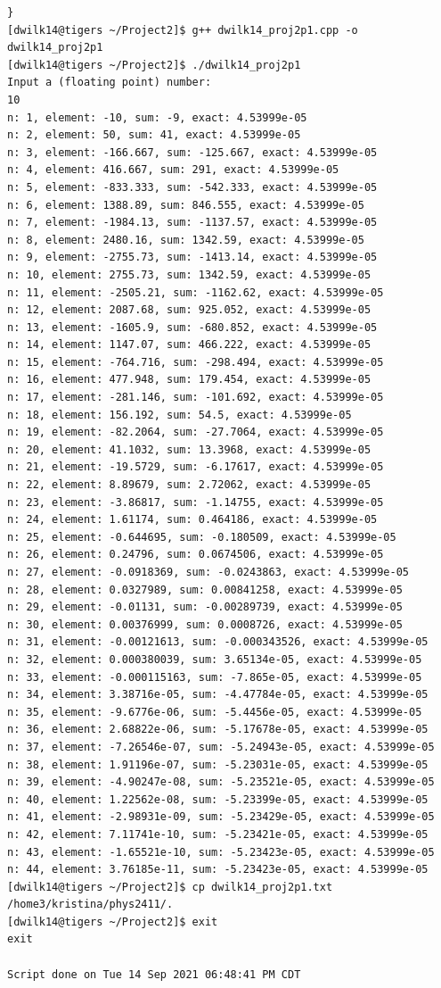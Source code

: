 \documentclass[11pt]{article}
\begin{document}
\begin{verbatim}
}
[dwilk14@tigers ~/Project2]$ g++ dwilk14_proj2p1.cpp -o dwilk14_proj2p1
[dwilk14@tigers ~/Project2]$ ./dwilk14_proj2p1
Input a (floating point) number:
10
n: 1, element: -10, sum: -9, exact: 4.53999e-05
n: 2, element: 50, sum: 41, exact: 4.53999e-05
n: 3, element: -166.667, sum: -125.667, exact: 4.53999e-05
n: 4, element: 416.667, sum: 291, exact: 4.53999e-05
n: 5, element: -833.333, sum: -542.333, exact: 4.53999e-05
n: 6, element: 1388.89, sum: 846.555, exact: 4.53999e-05
n: 7, element: -1984.13, sum: -1137.57, exact: 4.53999e-05
n: 8, element: 2480.16, sum: 1342.59, exact: 4.53999e-05
n: 9, element: -2755.73, sum: -1413.14, exact: 4.53999e-05
n: 10, element: 2755.73, sum: 1342.59, exact: 4.53999e-05
n: 11, element: -2505.21, sum: -1162.62, exact: 4.53999e-05
n: 12, element: 2087.68, sum: 925.052, exact: 4.53999e-05
n: 13, element: -1605.9, sum: -680.852, exact: 4.53999e-05
n: 14, element: 1147.07, sum: 466.222, exact: 4.53999e-05
n: 15, element: -764.716, sum: -298.494, exact: 4.53999e-05
n: 16, element: 477.948, sum: 179.454, exact: 4.53999e-05
n: 17, element: -281.146, sum: -101.692, exact: 4.53999e-05
n: 18, element: 156.192, sum: 54.5, exact: 4.53999e-05
n: 19, element: -82.2064, sum: -27.7064, exact: 4.53999e-05
n: 20, element: 41.1032, sum: 13.3968, exact: 4.53999e-05
n: 21, element: -19.5729, sum: -6.17617, exact: 4.53999e-05
n: 22, element: 8.89679, sum: 2.72062, exact: 4.53999e-05
n: 23, element: -3.86817, sum: -1.14755, exact: 4.53999e-05
n: 24, element: 1.61174, sum: 0.464186, exact: 4.53999e-05
n: 25, element: -0.644695, sum: -0.180509, exact: 4.53999e-05
n: 26, element: 0.24796, sum: 0.0674506, exact: 4.53999e-05
n: 27, element: -0.0918369, sum: -0.0243863, exact: 4.53999e-05
n: 28, element: 0.0327989, sum: 0.00841258, exact: 4.53999e-05
n: 29, element: -0.01131, sum: -0.00289739, exact: 4.53999e-05
n: 30, element: 0.00376999, sum: 0.0008726, exact: 4.53999e-05
n: 31, element: -0.00121613, sum: -0.000343526, exact: 4.53999e-05
n: 32, element: 0.000380039, sum: 3.65134e-05, exact: 4.53999e-05
n: 33, element: -0.000115163, sum: -7.865e-05, exact: 4.53999e-05
n: 34, element: 3.38716e-05, sum: -4.47784e-05, exact: 4.53999e-05
n: 35, element: -9.6776e-06, sum: -5.4456e-05, exact: 4.53999e-05
n: 36, element: 2.68822e-06, sum: -5.17678e-05, exact: 4.53999e-05
n: 37, element: -7.26546e-07, sum: -5.24943e-05, exact: 4.53999e-05
n: 38, element: 1.91196e-07, sum: -5.23031e-05, exact: 4.53999e-05
n: 39, element: -4.90247e-08, sum: -5.23521e-05, exact: 4.53999e-05
n: 40, element: 1.22562e-08, sum: -5.23399e-05, exact: 4.53999e-05
n: 41, element: -2.98931e-09, sum: -5.23429e-05, exact: 4.53999e-05
n: 42, element: 7.11741e-10, sum: -5.23421e-05, exact: 4.53999e-05
n: 43, element: -1.65521e-10, sum: -5.23423e-05, exact: 4.53999e-05
n: 44, element: 3.76185e-11, sum: -5.23423e-05, exact: 4.53999e-05
[dwilk14@tigers ~/Project2]$ cp dwilk14_proj2p1.txt /home3/kristina/phys2411/.
[dwilk14@tigers ~/Project2]$ exit
exit

Script done on Tue 14 Sep 2021 06:48:41 PM CDT

\end{verbatim}
\end{document}
